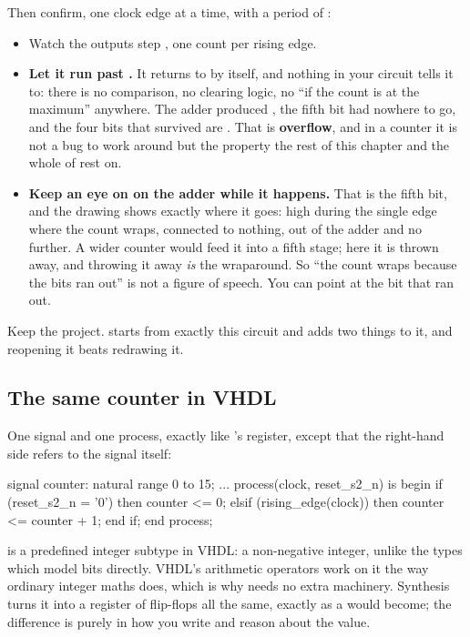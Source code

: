 Then confirm, one clock edge at a time, with a period of :
\begin{itemize}
  \item Watch the outputs step , one count per rising edge.
  \item \textbf{Let it run past .} It returns to  by itself, and nothing in
    your circuit tells it to: there is no comparison, no clearing logic, no ``if the count is at the
    maximum'' anywhere. The adder produced , the fifth bit had nowhere to go, and the
    four bits that survived are . That is \textbf{overflow}, and in a counter it is not a
    bug to work around but the property the rest of this chapter and the whole of 
    rest on.
  \item \textbf{Keep an eye on  on the adder while it happens.} That is the fifth
    bit, and the drawing shows exactly where it goes: high during the single edge where the count
    wraps, connected to nothing, out of the adder and no further. A wider counter would feed it into
    a fifth stage; here it is thrown away, and throwing it away \emph{is} the wraparound. So ``the
    count wraps because the bits ran out'' is not a figure of speech. You can point at the bit that
    ran out.
\end{itemize}

Keep the project.  starts from exactly this circuit and adds two things to it, and
reopening it beats redrawing it.

\subsection*{The same counter in VHDL}
One signal and one process, exactly like 's register, except that the right-hand side
refers to the signal itself:

\begin{vhdlcode}
signal counter: natural range 0 to 15;
...
process(clock, reset_s2_n) is
begin
    if (reset_s2_n = '0') then
        counter <= 0;
    elsif (rising_edge(clock)) then
        counter <= counter + 1;
    end if;
end process;
\end{vhdlcode}

 is a predefined integer subtype in VHDL: a non-negative integer, unlike the
 types which model bits directly. VHDL's arithmetic operators work on it the way
ordinary integer maths does, which is why  needs no extra machinery. Synthesis
turns it into a register of flip-flops all the same, exactly as a  would
become; the difference is purely in how you write and reason about the value.


